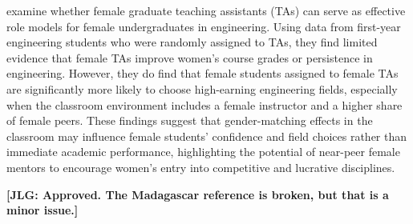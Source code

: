  \citet{griffith_role_2021} examine whether female graduate teaching assistants (TAs) can serve as effective role models for female undergraduates in engineering. Using data from first-year engineering students who were randomly assigned to TAs, they find limited evidence that female TAs improve women’s course grades or persistence in engineering. However, they do find that female students assigned to female TAs are significantly more likely to choose high-earning engineering fields, especially when the classroom environment includes a female instructor and a higher share of female peers. These findings suggest that gender-matching effects in the classroom may influence female students’ confidence and field choices rather than immediate academic performance, highlighting the potential of near-peer female mentors to encourage women’s entry into competitive and lucrative disciplines.
 
 \noindent \textbf{[JLG: Approved. The Madagascar reference is broken, but that is a minor issue.]}





